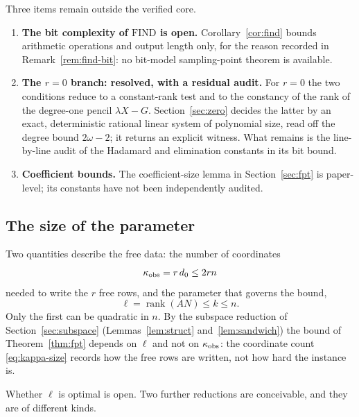 \documentclass[journal]{IEEEtran}
\theoremstyle{plainn}
\theoremstyle{remark}
\begin{document}
Three items remain outside the verified core.
\begin{enumerate}
\item \textbf{The bit complexity of $\mathrm{FIND}$ is open.} Corollary~\ref{cor:find} bounds
arithmetic operations and output length only, for the reason recorded in Remark~\ref{rem:find-bit}:
no bit-model sampling-point theorem is available.
\item \textbf{The $r=0$ branch: resolved, with a residual audit.} For $r=0$ the two conditions reduce to a constant-rank test and to the constancy of the rank of the degree-one pencil $\lambda X-G$. Section~\ref{sec:zero} decides the latter by an exact, deterministic rational linear system of
polynomial size, read off the degree bound $2\omega-2$; it returns an explicit witness. What remains
is the line-by-line audit of the Hadamard and elimination constants in its bit bound.
\item \textbf{Coefficient bounds.} The coefficient-size lemma in Section~\ref{sec:fpt} is paper-level; its constants have not been independently audited.
\end{enumerate}

\subsection{The size of the parameter}\label{sec:paramsize}

Two quantities describe the free data: the number of coordinates
\begin{equation}\label{eq:kappa-size}
\kappa_{\rm obs}=r\,d_0\le2rn
\end{equation}
needed to write the $r$ free rows, and the parameter that governs the bound,
\begin{equation}\label{eq:ell-size}
\ell=\operatorname{rank}(AN)\le k\le n .
\end{equation}
Only the first can be quadratic in $n$. By the subspace reduction of Section~\ref{sec:subspace}
(Lemmas~\ref{lem:struct} and~\ref{lem:sandwich}) the bound of Theorem~\ref{thm:fpt} depends on
$\ell$ and not on $\kappa_{\rm obs}$: the coordinate count \eqref{eq:kappa-size} records how the
free rows are written, not how hard the instance is.

Whether $\ell$ is optimal is open. Two further reductions are conceivable, and they are of
different kinds.
\end{document}
